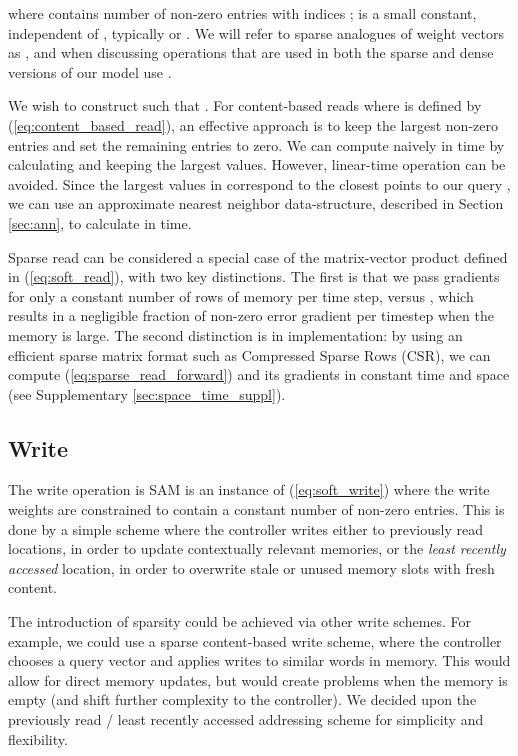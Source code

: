 \documentclass{article}
\begin{document}
where  contains  number of non-zero entries with indices ;  is a small constant, independent of , typically  or . We will refer to sparse analogues of weight vectors  as , and when discussing operations that are used in both the sparse and dense versions of our model use .

We wish to construct  such that . For content-based reads where  is defined by (\ref{eq:content_based_read}), an effective approach is to keep the  largest non-zero entries and set the remaining entries to zero. We can compute  naively in  time by calculating  and keeping the  largest values.
However, linear-time operation can be avoided. Since the  largest values in  correspond to the  closest points to our query , we can use an approximate nearest neighbor data-structure, described in Section \ref{sec:ann}, to calculate  in  time.

Sparse read can be considered a special case of the matrix-vector product defined in (\ref{eq:soft_read}), with two key distinctions. The first is that we pass gradients for only  a constant  number of rows of memory per time step, versus , which results in a negligible fraction of non-zero error gradient per timestep when the memory is large. The second distinction is in implementation: by using an efficient sparse matrix format such as Compressed Sparse Rows (CSR), we can compute (\ref{eq:sparse_read_forward}) and its gradients in constant time and space (see Supplementary \ref{sec:space_time_suppl}).

















\subsection{Write}

The write operation is SAM is an instance of (\ref{eq:soft_write}) where the write weights  are constrained to contain a constant number of non-zero entries. This is done by a simple scheme where the controller writes either to previously read locations, in order to update contextually relevant memories, or the \textit{least recently accessed} location, in order to overwrite stale or unused memory slots with fresh content.

The introduction of sparsity could be achieved via other write schemes. For example, we could use a sparse content-based write scheme, where the controller chooses a query vector  and applies writes to similar words in memory. This would allow for direct memory updates, but would create problems when the memory is empty (and shift further complexity to the controller). We decided upon the previously read / least recently accessed addressing scheme for simplicity and flexibility.
\end{document}

